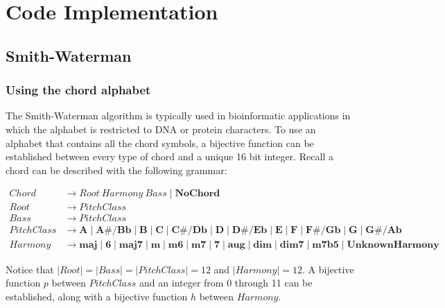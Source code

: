 \chapter{Code Implementation}

\section{Smith-Waterman}

\subsection{Using the chord alphabet}

The Smith-Waterman algorithm is typically used in bioinformatic applications in which the alphabet is restricted to DNA or protein characters. To use an alphabet that contains all the chord symbols, a bijective function can be established between every type of chord and a unique 16 bit integer. Recall a chord can be described with the following grammar:

\begin{align*}
Chord &\to Root\ Harmony \ Bass \mid \textbf{NoChord} \\
Root &\to PitchClass \\
Bass &\to PitchClass \\
PitchClass &\to \textbf{A} \mid \textbf{A#/Bb} \mid \textbf{B} \mid \textbf{C} \mid \textbf{C#/Db} \mid \textbf{D} \mid \textbf{D#/Eb} \mid \textbf{E} \mid \textbf{F} \mid \textbf{F#/Gb} \mid \textbf{G} \mid \textbf{G#/Ab} \\
Harmony &\to \textbf{maj} \mid \textbf{6} \mid \textbf{maj7} \mid \textbf{m} \mid \textbf{m6} \mid \textbf{m7} \mid \textbf{7} \mid \textbf{aug} \mid \textbf{dim} \mid \textbf{dim7} \mid \textbf{m7b5} \mid \textbf{UnknownHarmony}
\end{align*}

Notice that $|Root| = |Bass| = |PitchClass| = 12$ and $|Harmony| = 12$. A bijective function $p$ between $PitchClass$ and an integer from 0 through 11 can be established, along with a bijective function $h$ between $Harmony$.

